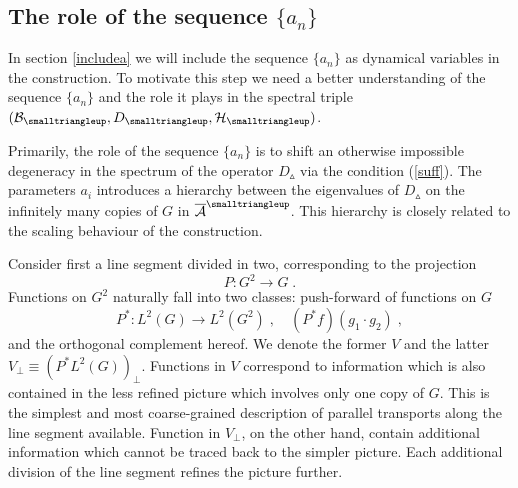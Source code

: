 \documentclass[12pt]{article}
\def\ca{{\cal A}}
\def\cb{{\cal B}}
\def\ch{{\cal H}}
\def\ck{{\cal K}}
\begin{document}































\subsection{The role of the sequence $\{a_n\}$}
\label{rolE}

In section \ref{includea} we will include the sequence $\{a_n\}$ as dynamical variables in the construction. To motivate this step we need a better understanding of the sequence $\{a_n\}$ and the role it plays in the spectral triple $(\cb_{\smalltriangleup},D_{\smalltriangleup},\ch_\smalltriangleup)$.


Primarily, the role of the sequence $\{a_n\}$ is to shift an otherwise impossible degeneracy in the spectrum of the operator $D_{\smalltriangleup}$ via the condition (\ref{suff}).
The parameters $a_i$ introduces a hierarchy between the eigenvalues of $D_{\smalltriangleup}$ on the infinitely many copies of $G$ in $\overline{\ca}^{\smalltriangleup}$. This hierarchy is closely related to the scaling behaviour of the construction. 

Consider first a line segment divided in two, corresponding to the projection 
$$P:G^2\rightarrow G\;.$$ 
Functions on $G^2$ naturally fall into two classes: push-forward of functions on $G$ 
$$
P^\ast: L^2(G)\rightarrow L^2(G^2)\;,\quad (P^\ast f)(g_1\cdot g_2)\;,
$$
and the orthogonal complement hereof. We denote the former $V$ and the latter $V_\perp\equiv(P^\ast L^2(G))_\perp$. Functions in $V$ correspond to information which is also contained in the less refined picture which involves only one copy of $G$. This is the simplest and most coarse-grained description of parallel transports along the line segment available. Function in $V_\perp$, on the other hand, contain additional information which cannot be traced back to the simpler picture. Each additional division of the line segment refines the picture further.
\end{document}
